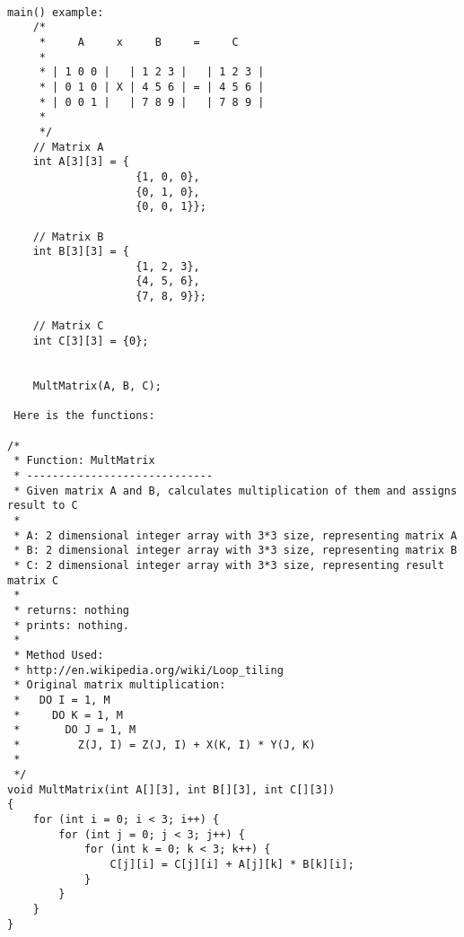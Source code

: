 \documentclass{article}
\begin{document}
		\begin{lstlisting}[label=multidimensional-array,caption=Multidimensional Array as function parameters]	

main() example:
    /*
     *     A     x     B     =     C
     *
     * | 1 0 0 |   | 1 2 3 |   | 1 2 3 |
     * | 0 1 0 | X | 4 5 6 | = | 4 5 6 |
     * | 0 0 1 |   | 7 8 9 |   | 7 8 9 |
     *
     */
    // Matrix A
    int A[3][3] = {
                    {1, 0, 0},
                    {0, 1, 0},
                    {0, 0, 1}};
    
    // Matrix B
    int B[3][3] = {
                    {1, 2, 3},
                    {4, 5, 6},
                    {7, 8, 9}};
    
    // Matrix C
    int C[3][3] = {0};
    
    
    MultMatrix(A, B, C);
    
 Here is the functions:

/*
 * Function: MultMatrix
 * -----------------------------
 * Given matrix A and B, calculates multiplication of them and assigns result to C
 *
 * A: 2 dimensional integer array with 3*3 size, representing matrix A
 * B: 2 dimensional integer array with 3*3 size, representing matrix B
 * C: 2 dimensional integer array with 3*3 size, representing result matrix C
 *
 * returns: nothing
 * prints: nothing.
 *
 * Method Used:
 * http://en.wikipedia.org/wiki/Loop_tiling
 * Original matrix multiplication:
 *   DO I = 1, M
 *     DO K = 1, M
 *       DO J = 1, M
 *         Z(J, I) = Z(J, I) + X(K, I) * Y(J, K)
 *
 */
void MultMatrix(int A[][3], int B[][3], int C[][3])
{
    for (int i = 0; i < 3; i++) {
        for (int j = 0; j < 3; j++) {
            for (int k = 0; k < 3; k++) {
                C[j][i] = C[j][i] + A[j][k] * B[k][i];
            }
        }
    }
}
		\end{lstlisting}
\end{document}
